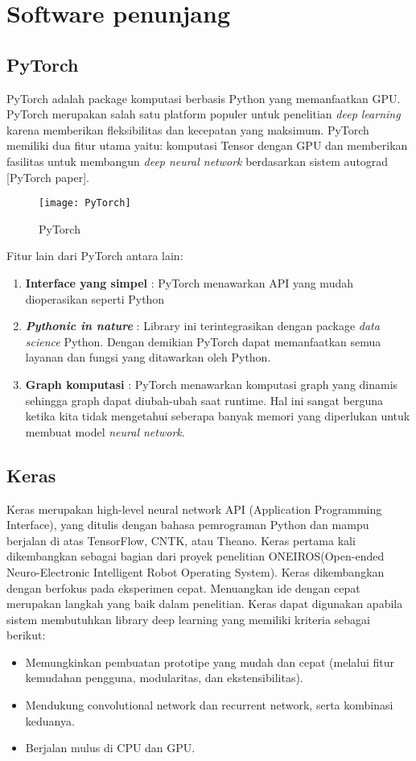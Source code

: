 \documentclass[../thesis.tex]{subfiles}
\begin{document}
\section{Software penunjang}
\subsection{PyTorch}
PyTorch adalah package komputasi berbasis Python yang memanfaatkan GPU. PyTorch merupakan salah satu platform populer untuk penelitian \textit{deep learning} karena memberikan fleksibilitas dan kecepatan yang maksimum.
PyTorch memiliki dua fitur utama yaitu: komputasi Tensor dengan GPU dan memberikan fasilitas untuk membangun \textit{deep neural network} berdasarkan sistem autograd [PyTorch paper]. 
\begin{figure}[htp]
	\centering
	\texttt{[image: PyTorch]}
	\caption{PyTorch}
	\label{PyTorch}
\end{figure}


Fitur lain dari PyTorch antara lain:
\begin{enumerate}
	\item \textbf{Interface yang simpel} : PyTorch menawarkan API yang mudah dioperasikan seperti Python
	\item \textbf{\textit{Pythonic in nature}} : Library ini terintegrasikan dengan package \textit{data science} Python. Dengan demikian PyTorch dapat memanfaatkan semua layanan dan fungsi yang ditawarkan oleh Python.
	\item \textbf{Graph komputasi} : PyTorch menawarkan komputasi graph yang dinamis sehingga graph dapat diubah-ubah saat runtime. Hal ini sangat berguna ketika kita tidak mengetahui seberapa banyak memori yang diperlukan untuk membuat model \textit{neural network}.
\end{enumerate}


\subsection{Keras}
Keras merupakan high-level neural network API (Application Programming Interface), yang ditulis dengan bahasa pemrograman Python dan mampu berjalan di atas TensorFlow, CNTK, atau
Theano. Keras pertama kali dikembangkan sebagai bagian dari proyek penelitian ONEIROS(Open-ended Neuro-Electronic Intelligent Robot Operating System). Keras dikembangkan dengan
berfokus pada eksperimen cepat. Menuangkan ide dengan cepat merupakan langkah yang baik dalam penelitian. Keras dapat digunakan apabila sistem membutuhkan library deep learning yang
memiliki kriteria sebagai berikut:
\begin{itemize}
	\item Memungkinkan pembuatan prototipe yang mudah dan cepat (melalui fitur kemudahan pengguna, modularitas, dan ekstensibilitas).
	\item Mendukung convolutional network dan recurrent network, serta kombinasi keduanya.
	\item Berjalan mulus di CPU dan GPU.
  \end{itemize}
\end{document}

